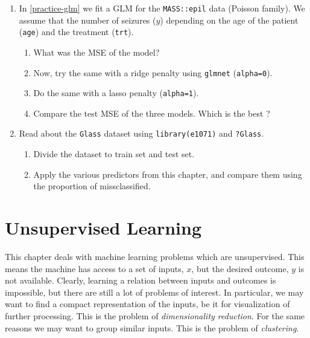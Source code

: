\documentclass[]{book}
\providecommand{\tightlist}{%
  \setlength{\itemsep}{0pt}\setlength{\parskip}{0pt}}
\theoremstyle{definition}
\theoremstyle{definition}
\theoremstyle{definition}
\theoremstyle{remark}
\begin{document}
\begin{enumerate}
\def\labelenumi{\arabic{enumi}.}
\tightlist
\item
  In \ref{practice-glm} we fit a GLM for the \texttt{MASS::epil} data
  (Poisson family). We assume that the number of seizures (\(y\))
  depending on the age of the patient (\texttt{age}) and the treatment
  (\texttt{trt}).

  \begin{enumerate}
  \def\labelenumii{\arabic{enumii}.}
  \tightlist
  \item
    What was the MSE of the model?
  \item
    Now, try the same with a ridge penalty using \texttt{glmnet}
    (\texttt{alpha=0}).
  \item
    Do the same with a lasso penalty (\texttt{alpha=1}).
  \item
    Compare the test MSE of the three models. Which is the best ?
  \end{enumerate}
\item
  Read about the \texttt{Glass} dataset using \texttt{library(e1071)}
  and \texttt{?Glass}.

  \begin{enumerate}
  \def\labelenumii{\arabic{enumii}.}
  \tightlist
  \item
    Divide the dataset to train set and test set.
  \item
    Apply the various predictors from this chapter, and compare them
    using the proportion of missclassified.
  \end{enumerate}
\end{enumerate}

\chapter{Unsupervised Learning}\label{unsupervised}

This chapter deals with machine learning problems which are
unsupervised. This means the machine has access to a set of inputs,
\(x\), but the desired outcome, \(y\) is not available. Clearly,
learning a relation between inputs and outcomes is impossible, but there
are still a lot of problems of interest. In particular, we may want to
find a compact representation of the inputs, be it for visualization of
further processing. This is the problem of \emph{dimensionality
reduction}. For the same reasons we may want to group similar inputs.
This is the problem of \emph{clustering}.
\end{document}
